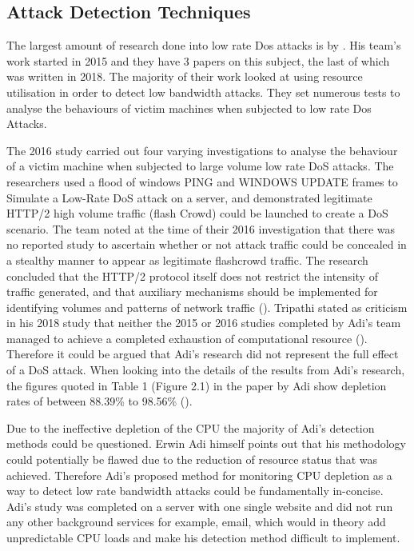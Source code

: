 \subsection{Attack Detection Techniques}

The largest amount of research done into low rate Dos attacks is by \citeauthor{Adi2015}. His team's work started in 2015 and they have 3 papers on this subject, the last of which was written in 2018. The majority of their work looked at using resource utilisation in order to detect low bandwidth attacks. They set numerous tests to analyse the behaviours of victim machines when subjected to low rate Dos Attacks. 

The 2016 study carried out four varying investigations to analyse the behaviour of a victim machine when subjected to large volume low rate DoS attacks. The researchers used a flood of windows PING and WINDOWS UPDATE frames to Simulate a Low-Rate DoS attack on a server, and demonstrated legitimate HTTP/2 high volume traffic (flash Crowd) could be launched to create a DoS scenario. The team noted at the time of their 2016 investigation that there was no reported study to ascertain whether or not attack traffic could be concealed in a stealthy manner to appear as legitimate flashcrowd traffic. The research concluded that the HTTP/2 protocol itself does not restrict the intensity of traffic generated, and that auxiliary mechanisms should be implemented for identifying volumes and patterns of network traffic  (\cite{Adi2016}). Tripathi stated as criticism in his 2018 study that neither the 2015 or 2016 studies completed by Adi's team managed to achieve a completed exhaustion of computational resource (\cite{tripathi2018slow}). Therefore it could be argued that Adi's research did not represent the full effect of a DoS attack. When looking into the details of the results from Adi's research, the figures quoted in Table 1 (Figure 2.1) in the paper by Adi show depletion rates of between 88.39\% to 98.56\% (\cite{Adi2016}).

Due to the ineffective depletion of the CPU the majority of Adi's detection methods could be questioned. Erwin Adi himself points out that his methodology could potentially be flawed due to the reduction of resource status that was achieved. Therefore Adi's proposed method for monitoring CPU depletion as a way to detect low rate bandwidth attacks could be fundamentally in-concise. Adi's study was completed on a server with one single website and did not run any other background services for example, email, which would in theory add unpredictable CPU loads and make his detection method difficult to implement.

